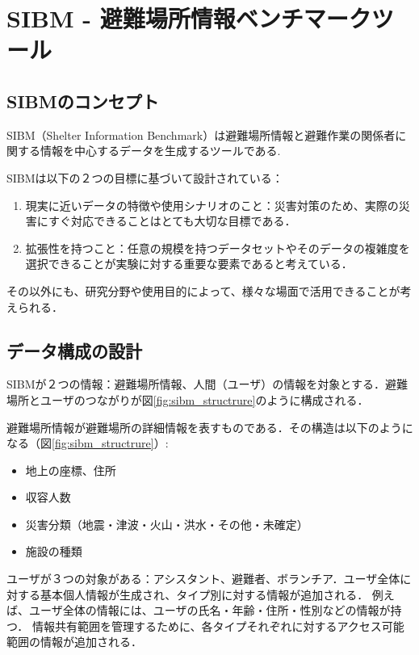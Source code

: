 ﻿%
\chapter{SIBM - 避難場所情報ベンチマークツール}

\section{SIBMのコンセプト}
\label{sibm:definition}

SIBM（Shelter Information Benchmark）は避難場所情報と避難作業の関係者に関する情報を中心するデータを生成するツールである.

SIBMは以下の２つの目標に基づいて設計されている：

\begin{enumerate}
  \item
  現実に近いデータの特徴や使用シナリオのこと：災害対策のため、実際の災害にすぐ対応できることはとても大切な目標である．
  \item 拡張性を持つこと：任意の規模を持つデータセットやそのデータの複雑度を選択できることが実験に対する重要な要素であると考えている．
\end{enumerate}

その以外にも、研究分野や使用目的によって、様々な場面で活用できることが考えられる．

\section{データ構成の設計}
\label{sibm:data_structure}

SIBMが２つの情報：避難場所情報、人間（ユーザ）の情報を対象とする．避難場所とユーザのつながりが図\ref{fig:sibm_structrure}のように構成される．

避難場所情報が避難場所の詳細情報を表すものである．その構造は以下のようになる（図\ref{fig:sibm_structrure}）:

\begin{itemize}
  \item 地上の座標、住所
  \item 収容人数
  \item 災害分類（地震・津波・火山・洪水・その他・未確定）
  \item 施設の種類
\end{itemize}

ユーザが３つの対象がある：アシスタント、避難者、ボランチア．ユーザ全体に対する基本個人情報が生成され、タイプ別に対する情報が追加される．
例えば、ユーザ全体の情報には、ユーザの氏名・年齢・住所・性別などの情報が持つ．
情報共有範囲を管理するために、各タイプそれぞれに対するアクセス可能範囲の情報が追加される．

